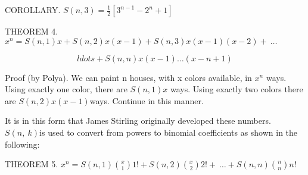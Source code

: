 COROLLARY.
\(S\left( n,3 \right) = \frac{1}{2}\left\lbrack 3^{n - 1} - 2^{n} + 1 \right\rbrack\)

THEOREM 4.
\(x^{n} = S\left( n,1 \right)x + S\left( n,2 \right)x\left( x - 1 \right) + S\left( n,3 \right)x\left( x - 1 \right)\left( x - 2 \right) + \ \ldots\ \)

\[
ldots + S\left( n,n \right)x\left( x - 1 \right)\ldots(x - n + 1)
\]

Proof (by Polya). We can paint n houses, with x colors available, in
\(x^{n}\) ways. Using exactly one color, there are
\(S\left( n,1 \right)x\) ways. Using exactly two colors there are
\(S\left( n,2 \right)x(x - 1)\)ways. Continue in this manner.

It is in this form that James Stirling originally developed these
numbers. \(S(n,\ k)\)is used to convert from powers to binomial
coefficients as shown in the following:

THEOREM 5. \(x^{n} = S\left( n,1 \right)
\binom{x}{1}
1! + S\left( n,2 \right)
\binom{x}{2}
2! + \ \ldots + S\left( n,n \right)
\binom{n}{n}
n!\ \)

